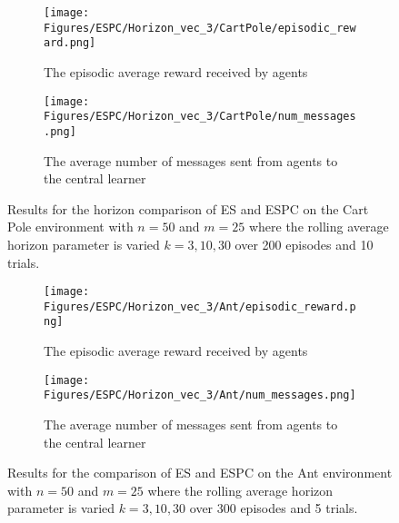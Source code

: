 \begin{figure}[H]
    \centering
    \begin{subfigure}{0.4\textwidth}
        \centering
        \texttt{[image: Figures/ESPC/Horizon\_vec\_3/CartPole/episodic\_reward.png]}
        \caption{The episodic average reward received by agents}
        \label{fig:HorizonEpisodicReward}
    \end{subfigure}
    \begin{subfigure}{0.4\textwidth}
        \centering
        \texttt{[image: Figures/ESPC/Horizon\_vec\_3/CartPole/num\_messages.png]}
        \caption{The average number of messages sent from agents to the central learner}
        \label{fig:HorizonMessages}
    \end{subfigure}
    \caption{Results for the horizon comparison of ES and ESPC on the Cart Pole environment with $n=50$ and $m=25$ where the rolling average horizon parameter is varied $k=3,10,30$ over 200 episodes and 10 trials.}
    \label{fig:CPHorizon}
\end{figure}

\begin{figure}[H]
    \centering
    \begin{subfigure}{0.4\textwidth}
        \centering
        \texttt{[image: Figures/ESPC/Horizon\_vec\_3/Ant/episodic\_reward.png]}
        \caption{The episodic average reward received by agents}
        \label{fig:AntHorizonEpisodicReward}
    \end{subfigure}
    \begin{subfigure}{0.4\textwidth}
        \centering
        \texttt{[image: Figures/ESPC/Horizon\_vec\_3/Ant/num\_messages.png]}
        \caption{The average number of messages sent from agents to the central learner}
        \label{fig:AntHorizonMessages}
    \end{subfigure}
    \caption{Results for the comparison of ES and ESPC on the Ant environment with $n=50$ and $m=25$ where the rolling average horizon parameter is varied $k=3,10,30$ over 300 episodes and 5 trials.}
    \label{fig:AntHorizon}
\end{figure}


